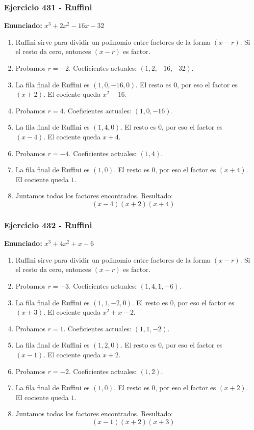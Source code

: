 \documentclass[11pt,a4paper]{article}
\begin{document}
\vspace{0.2cm}
\subsubsection*{Ejercicio 431 - Ruffini}
\textbf{Enunciado:} $ x^{3} + 2 x^{2} - 16 x - 32 $\par
\begin{enumerate}[leftmargin=2em]
\item Ruffini sirve para dividir un polinomio entre factores de la forma \((x-r)\). Si el resto da cero, entonces \((x-r)\) es factor.
\item Probamos \(r=-2\). Coeficientes actuales: \((1, 2, -16, -32)\).
\item La fila final de Ruffini es \((1, 0, -16, 0)\). El resto es \(0\), por eso el factor es \((x+2)\). El cociente queda \(x^{2} - 16\).
\item Probamos \(r=4\). Coeficientes actuales: \((1, 0, -16)\).
\item La fila final de Ruffini es \((1, 4, 0)\). El resto es \(0\), por eso el factor es \((x-4)\). El cociente queda \(x + 4\).
\item Probamos \(r=-4\). Coeficientes actuales: \((1, 4)\).
\item La fila final de Ruffini es \((1, 0)\). El resto es \(0\), por eso el factor es \((x+4)\). El cociente queda \(1\).
\item Juntamos todos los factores encontrados. Resultado: \[\boxed{\left(x - 4\right) \left(x + 2\right) \left(x + 4\right)}\]
\end{enumerate}

\vspace{0.2cm}
\subsubsection*{Ejercicio 432 - Ruffini}
\textbf{Enunciado:} $ x^{3} + 4 x^{2} + x - 6 $\par
\begin{enumerate}[leftmargin=2em]
\item Ruffini sirve para dividir un polinomio entre factores de la forma \((x-r)\). Si el resto da cero, entonces \((x-r)\) es factor.
\item Probamos \(r=-3\). Coeficientes actuales: \((1, 4, 1, -6)\).
\item La fila final de Ruffini es \((1, 1, -2, 0)\). El resto es \(0\), por eso el factor es \((x+3)\). El cociente queda \(x^{2} + x - 2\).
\item Probamos \(r=1\). Coeficientes actuales: \((1, 1, -2)\).
\item La fila final de Ruffini es \((1, 2, 0)\). El resto es \(0\), por eso el factor es \((x-1)\). El cociente queda \(x + 2\).
\item Probamos \(r=-2\). Coeficientes actuales: \((1, 2)\).
\item La fila final de Ruffini es \((1, 0)\). El resto es \(0\), por eso el factor es \((x+2)\). El cociente queda \(1\).
\item Juntamos todos los factores encontrados. Resultado: \[\boxed{\left(x - 1\right) \left(x + 2\right) \left(x + 3\right)}\]
\end{enumerate}
\end{document}
